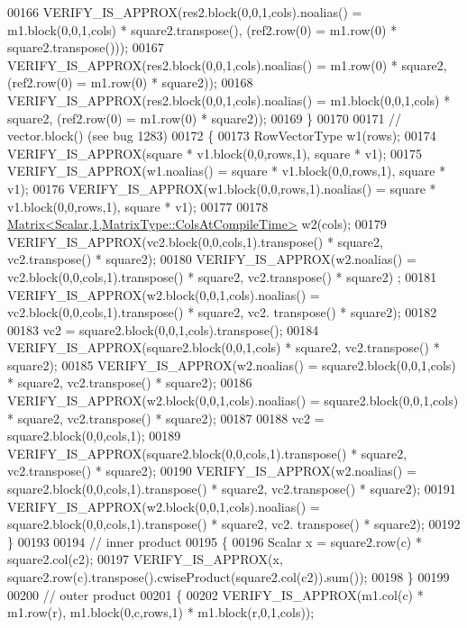\begin{DoxyCode}
00166     VERIFY\_IS\_APPROX(res2.block(0,0,1,cols).noalias() = m1.block(0,0,1,cols) * square2.transpose(),        
         (ref2.row(0) = m1.row(0) * square2.transpose()));
00167     VERIFY\_IS\_APPROX(res2.block(0,0,1,cols).noalias() = m1.row(0) * square2,                               
         (ref2.row(0) = m1.row(0) * square2));
00168     VERIFY\_IS\_APPROX(res2.block(0,0,1,cols).noalias() = m1.block(0,0,1,cols) * square2,                    
         (ref2.row(0) = m1.row(0) * square2));
00169   \}
00170 
00171   \textcolor{comment}{// vector.block() (see bug 1283)}
00172   \{
00173     RowVectorType w1(rows);
00174     VERIFY\_IS\_APPROX(square * v1.block(0,0,rows,1), square * v1);
00175     VERIFY\_IS\_APPROX(w1.noalias() = square * v1.block(0,0,rows,1), square * v1);
00176     VERIFY\_IS\_APPROX(w1.block(0,0,rows,1).noalias() = square * v1.block(0,0,rows,1), square * v1);
00177 
00178     \hyperlink{group___core___module_class_eigen_1_1_matrix}{Matrix<Scalar,1,MatrixType::ColsAtCompileTime>} w2(cols);
00179     VERIFY\_IS\_APPROX(vc2.block(0,0,cols,1).transpose() * square2, vc2.transpose() * square2);
00180     VERIFY\_IS\_APPROX(w2.noalias() = vc2.block(0,0,cols,1).transpose() * square2, vc2.transpose() * square2)
      ;
00181     VERIFY\_IS\_APPROX(w2.block(0,0,1,cols).noalias() = vc2.block(0,0,cols,1).transpose() * square2, vc2.
      transpose() * square2);
00182 
00183     vc2 = square2.block(0,0,1,cols).transpose();
00184     VERIFY\_IS\_APPROX(square2.block(0,0,1,cols) * square2, vc2.transpose() * square2);
00185     VERIFY\_IS\_APPROX(w2.noalias() = square2.block(0,0,1,cols) * square2, vc2.transpose() * square2);
00186     VERIFY\_IS\_APPROX(w2.block(0,0,1,cols).noalias() = square2.block(0,0,1,cols) * square2, vc2.transpose() 
      * square2);
00187 
00188     vc2 = square2.block(0,0,cols,1);
00189     VERIFY\_IS\_APPROX(square2.block(0,0,cols,1).transpose() * square2, vc2.transpose() * square2);
00190     VERIFY\_IS\_APPROX(w2.noalias() = square2.block(0,0,cols,1).transpose() * square2, vc2.transpose() * 
      square2);
00191     VERIFY\_IS\_APPROX(w2.block(0,0,1,cols).noalias() = square2.block(0,0,cols,1).transpose() * square2, vc2.
      transpose() * square2);
00192   \}
00193 
00194   \textcolor{comment}{// inner product}
00195   \{
00196     Scalar x = square2.row(c) * square2.col(c2);
00197     VERIFY\_IS\_APPROX(x, square2.row(c).transpose().cwiseProduct(square2.col(c2)).sum());
00198   \}
00199 
00200   \textcolor{comment}{// outer product}
00201   \{
00202     VERIFY\_IS\_APPROX(m1.col(c) * m1.row(r), m1.block(0,c,rows,1) * m1.block(r,0,1,cols));

\end{DoxyCode}
